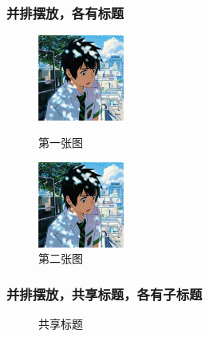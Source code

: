 \documentclass[UTF8]{article}
\begin{document}
\subsubsection{并排摆放，各有标题}
\begin{figure}[htbp]
\centering
\begin{minipage}{80pt}
	\includegraphics[width=80pt]{test.jpg}
	\caption{第一张图}
\end{minipage}
\hspace{10pt}
\begin{minipage}{80pt}
	\includegraphics[width=80pt]{test.jpg}
	\caption{第二张图}
\end{minipage}
\end{figure}

\subsubsection{并排摆放，共享标题，各有子标题}%
\begin{figure}[htbp]
\centering
{}
\hspace{10pt}
\caption{共享标题}
\end{figure}
\end{document}
